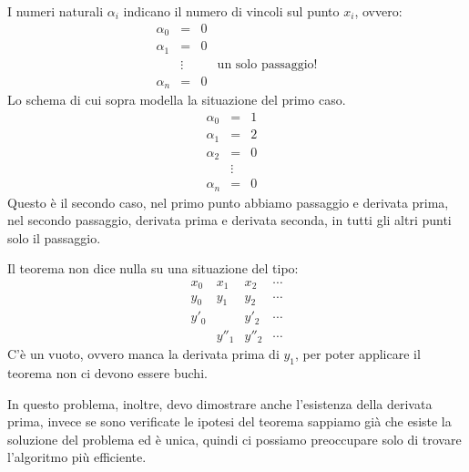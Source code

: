 I numeri naturali $\alpha_i$ indicano il numero di vincoli sul punto $x_i$,
ovvero:
\[\begin{array}{cccc}
\alpha_0  & =  & 0 &  \\
\alpha_1  & =  & 0 & \\
  & \vdots    &     &\textrm{un solo passaggio!}\\
 \alpha_n    & = & 0      &
\end{array}
\]
Lo schema di cui sopra modella la situazione del primo caso.
\[\begin{array}{cccc}
\alpha_0  & =  & 1 &  \\
\alpha_1  & =  & 2 & \\
\alpha_2  & =  & 0 & \\
  & \vdots    &     & \\
 \alpha_n    & = & 0      &
\end{array}
\]
Questo è il secondo caso, nel primo punto abbiamo passaggio e derivata prima,
nel secondo passaggio, derivata prima e derivata seconda, in tutti gli altri
punti solo il passaggio.

\begin{osse}
Il teorema non dice nulla su una situazione del tipo:
\[\begin{array}{cccc}
x_0  & x_1   & x_2   & \cdots \\
y_0  & y_1   & y_2   & \cdots  \\
y'_0 &       & y'_2  & \cdots  \\
     & y''_1 & y''_2 & \cdots
\end{array}\]
C'è un vuoto, ovvero manca la derivata prima di $y_1$, per poter applicare il
teorema non ci devono essere buchi.

In questo problema, inoltre, devo dimostrare anche l'esistenza della derivata
prima, invece se sono verificate le ipotesi del teorema sappiamo già che
esiste la soluzione del problema ed è unica, quindi ci possiamo preoccupare
solo di trovare l'algoritmo più efficiente.
\end{osse}

